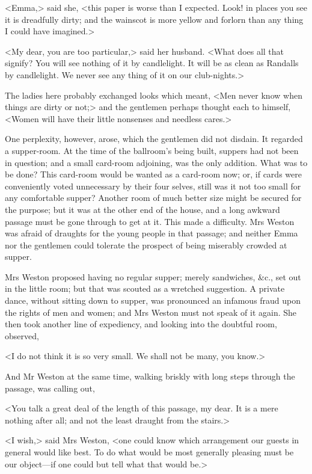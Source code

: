 <Emma,> said she, <this paper is worse than I expected. Look! in places you see it is dreadfully dirty; and the wainscot is more yellow and forlorn than any thing I could have imagined.>

<My dear, you are too particular,> said her husband. <What does all that signify? You will see nothing of it by candlelight. It will be as clean as Randalls by candlelight. We never see any thing of it on our club-nights.>

The ladies here probably exchanged looks which meant, <Men never know when things are dirty or not;> and the gentlemen perhaps thought each to himself, <Women will have their little nonsenses and needless cares.>

One perplexity, however, arose, which the gentlemen did not disdain. It regarded a supper-room. At the time of the ballroom's being built, suppers had not been in question; and a small card-room adjoining, was the only addition. What was to be done? This card-room would be wanted as a card-room now; or, if cards were conveniently voted unnecessary by their four selves, still was it not too small for any comfortable supper? Another room of much better size might be secured for the purpose; but it was at the other end of the house, and a long awkward passage must be gone through to get at it. This made a difficulty. Mrs Weston was afraid of draughts for the young people in that passage; and neither Emma nor the gentlemen could tolerate the prospect of being miserably crowded at supper.

Mrs Weston proposed having no regular supper; merely sandwiches, \&c., set out in the little room; but that was scouted as a wretched suggestion. A private dance, without sitting down to supper, was pronounced an infamous fraud upon the rights of men and women; and Mrs Weston must not speak of it again. She then took another line of expediency, and looking into the doubtful room, observed,

<I do not think it is so very small. We shall not be many, you know.>

And Mr Weston at the same time, walking briskly with long steps through the passage, was calling out,

<You talk a great deal of the length of this passage, my dear. It is a mere nothing after all; and not the least draught from the stairs.>

<I wish,> said Mrs Weston, <one could know which arrangement our guests in general would like best. To do what would be most generally pleasing must be our object—if one could but tell what that would be.>


